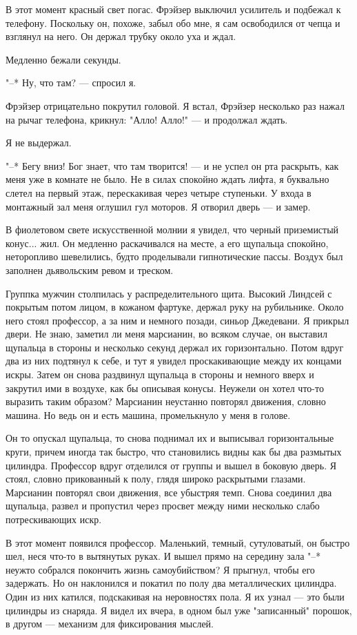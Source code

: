 В этот момент красный свет погас. Фрэйзер выключил усилитель и подбежал
к телефону. Поскольку он, похоже, забыл обо  мне,  я  сам  освободился  от
чепца и взглянул на него. Он держал трубку около уха и ждал.

Медленно бежали секунды.

"--* Ну, что там? --- спросил я.

Фрэйзер отрицательно покрутил головой. Я встал, Фрэйзер  несколько  раз
нажал на рычаг телефона, крикнул: "Алло! Алло!" --- и продолжал ждать.

Я не выдержал.

"--* Бегу вниз! Бог знает, что там творится! --- и не успел он рта раскрыть,
как меня уже в комнате не  было.  Не  в  силах  спокойно  ждать  лифта,  я
буквально слетел на первый этаж, перескакивая через  четыре  ступеньки.  У
входа в монтажный зал меня оглушил гул моторов. Я отворил дверь --- и замер.

В  фиолетовом  свете  искусственной  молнии  я   увидел,   что   черный
приземистый конус...  жил.  Он  медленно  раскачивался  на  месте,  а  его
щупальца спокойно, неторопливо шевелились, будто проделывали гипнотические
пассы. Воздух был заполнен дьявольским ревом и треском.

Группка мужчин столпилась у распределительного щита. Высокий Линдсей  с
покрытым потом лицом, в кожаном фартуке, держал руку на рубильнике.  Около
него стоял профессор, а за ним  и  немного  позади,  синьор  Джедевани.  Я
прикрыл двери. Не знаю, заметил ли меня марсианин, во  всяком  случае,  он
выставил щупальца в стороны и несколько секунд  держал  их  горизонтально.
Потом вдруг два из них подтянул к себе,  и  тут  я  увидел  проскакивающие
между их концами искры. Затем он снова  раздвинул  щупальца  в  стороны  и
немного вверх и закрутил ими в воздухе, как бы описывая конусы. Неужели он
хотел  что-то  выразить  таким  образом?  Марсианин   неустанно   повторял
движения, словно машина. Но ведь он и есть машина, промелькнуло у  меня  в
голове.

Он то опускал щупальца, то снова поднимал их и выписывал горизонтальные
круги, причем иногда так быстро, что становились видны как бы два размытых
цилиндра. Профессор вдруг отделился от группы и вышел в боковую  дверь.  Я
стоял,  словно  прикованный  к  полу,  глядя  широко  раскрытыми  глазами.
Марсианин повторял свои движения, все убыстряя темп.  Снова  соединил  два
щупальца, развел и пропустил через  просвет  между  ними  несколько  слабо
потрескивающих искр.

В этот момент появился профессор. Маленький,  темный,  сутуловатый,  он
быстро шел, неся что-то в вытянутых руках. И вышел прямо на середину  зала
"--* неужто собрался покончить жизнь  самоубийством?  Я  прыгнул,  чтобы  его
задержать. Но он наклонился и покатил по полу два металлических  цилиндра.
Один из них катился, подскакивая на неровностях пола. Я  их  узнал  ---  это
были цилиндры из снаряда. Я видел их вчера, в одном был  уже  "записанный"
порошок, в другом --- механизм для фиксирования мыслей.

